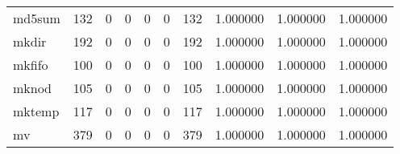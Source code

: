 \begin{longtable}{lrrrrrrrrr}
md5sum    &                                                132 &                                                  0 &                                                  0 &                                                  0 &                                                  0 &                                                132 &                                           1.000000 &                               1.000000 &                             1.000000 \\
mkdir     &                                                192 &                                                  0 &                                                  0 &                                                  0 &                                                  0 &                                                192 &                                           1.000000 &                               1.000000 &                             1.000000 \\
mkfifo    &                                                100 &                                                  0 &                                                  0 &                                                  0 &                                                  0 &                                                100 &                                           1.000000 &                               1.000000 &                             1.000000 \\
mknod     &                                                105 &                                                  0 &                                                  0 &                                                  0 &                                                  0 &                                                105 &                                           1.000000 &                               1.000000 &                             1.000000 \\
mktemp    &                                                117 &                                                  0 &                                                  0 &                                                  0 &                                                  0 &                                                117 &                                           1.000000 &                               1.000000 &                             1.000000 \\
mv        &                                                379 &                                                  0 &                                                  0 &                                                  0 &                                                  0 &                                                379 &                                           1.000000 &                               1.000000 &                             1.000000 \\

\end{longtable}
